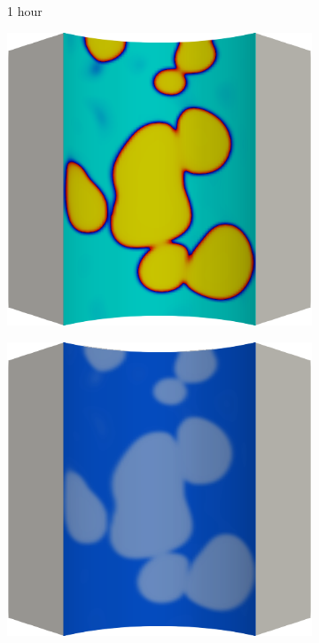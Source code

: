 \begin{figure}[!htbp]
  \begin{subfigure}{0.15\textwidth}
    \centering
    \caption*{1 hour}
  \end{subfigure}
  \begin{subfigure}{0.19\textwidth}
    \centering
    \includegraphics[width=\textwidth]{Chapter5/figures/spallation/c.0021}
  \end{subfigure}
  \hspace{0.06\textwidth}
  \begin{subfigure}{0.19\textwidth}
    \centering
    \includegraphics[width=\textwidth]{Chapter5/figures/spallation/d.0021}

\end{subfigure}
\end{figure}
